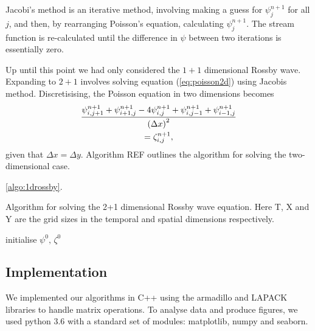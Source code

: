 Jacobi's method is an iterative method, involving making a guess for $\psi^{n+1}_j$ for all $j$, and then, by rearranging Poisson's equation, calculating $\psi_j^{n+1}$. The stream function is re-calculated until the difference in $\psi$ between two iterations is essentially zero.       

Up until this point we had only considered the $1 + 1$ dimensional Rossby wave. Expanding to $2 + 1$ involves solving equation (\ref{eq:poisson2d}) using Jacobis method. Discretisising, the Poisson equation in two dimensions becomes
	\begin{multline}
	\label{eq:poissondiscret}
	\frac{\psi^{n+1}_{i,j+1} + \psi^{n+1}_{i+1,j} - 4\psi^{n+1}_{i,j} + \psi^{n+1}_{i,j-1}+ \psi^{n+1}_{i-1,j}}{\qty(\Delta x)^2} \\= \zeta^{n+1}_{i,j},
	\end{multline}
given that $\Delta x = \Delta y$. Algorithm REF outlines the algorithm for solving the two-dimensional case.

\ref{algo:1drossby}.
\begin{algorithm}[htbp]
	\caption{Algorithm for solving the 2+1 dimensional Rossby wave equation. Here T, X and Y are the grid sizes in the temporal and spatial dimensions respectively.}
	\SetAlgoLined
	\BlankLine
	\BlankLine
	initialise $\psi^0,\, \zeta^0$\;
	\BlankLine
	\BlankLine
	\label{algo:2drossby}
\end{algorithm} 

\subsection{Implementation}
\label{sec:implement}
We implemented our algorithms in C++ using the armadillo and LAPACK libraries to handle matrix operations. To analyse data and produce figures, we used python 3.6 with a standard set of modules: matplotlib, numpy and seaborn.

